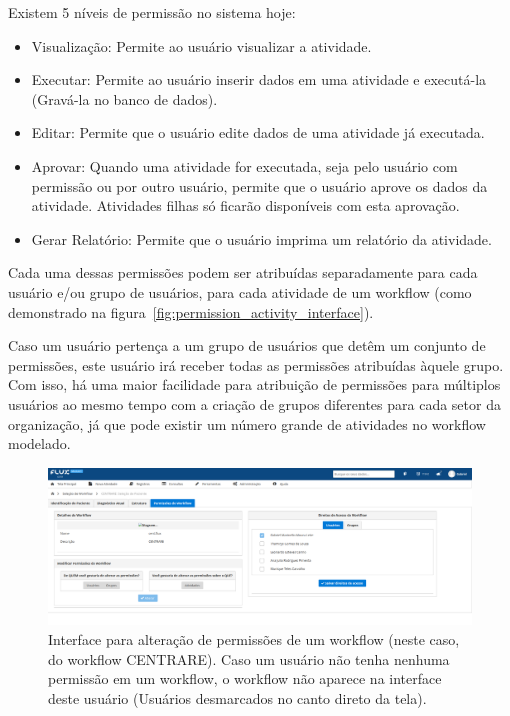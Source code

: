 Existem 5 níveis de permissão no sistema hoje:

\begin{itemize}
    \item Visualização: Permite ao usuário visualizar a atividade.
    \item Executar: Permite ao usuário inserir dados em uma atividade e executá-la (Gravá-la no banco de dados).
    \item Editar: Permite que o usuário edite dados de uma atividade já executada.
    \item Aprovar: Quando uma atividade for executada, seja pelo usuário com permissão ou por outro usuário, permite que o usuário aprove os dados da atividade. Atividades filhas só ficarão disponíveis com esta aprovação.
    \item Gerar Relatório: Permite que o usuário imprima um relatório da atividade.
\end{itemize}

Cada uma dessas permissões podem ser atribuídas separadamente para cada usuário e/ou grupo de usuários, para cada atividade de um workflow (como demonstrado na figura~\ref{fig:permission_activity_interface}).

Caso um usuário pertença a um grupo de usuários que detêm um conjunto de permissões, este usuário irá receber todas as permissões atribuídas àquele grupo. Com isso, há uma maior facilidade para atribuição de permissões para múltiplos usuários ao mesmo tempo com a criação de grupos diferentes para cada setor da organização, já que pode existir um número grande de atividades no workflow modelado.

\begin{figure}
    \centering
    \includegraphics[width=\textwidth]{imgs/Flux/Permissoes/telaPermissoesCENTRARE.png}
    \caption{Interface para alteração de permissões de um workflow (neste caso, do workflow CENTRARE). Caso um usuário não tenha nenhuma permissão em um workflow, o workflow não aparece na interface deste usuário (Usuários desmarcados no canto direto da tela).}
    \label{fig:permission_interface}
\end{figure}

